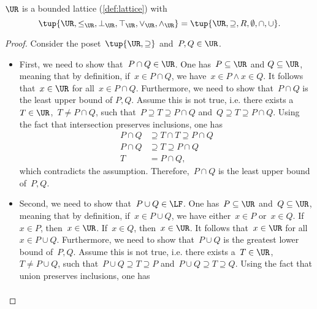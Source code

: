 
\begin{lemma}
  \label{lem:u_bounded_lat}
  $\UR$ is a bounded lattice (\cref{def:lattice}) with
  \begin{equation}
    \tup{\UR,\leq_{\UR},\bot_{\UR},\top_{\UR},\vee_{\UR},\wedge_{\UR}}=\tup{\UR,\supseteq,R,\emptyset,\cap,\cup}.
  \end{equation}
\end{lemma}
\begin{proof}
  Consider the poset~$\tup{\UR,\supseteq}$ and~$P,Q\in \UR$.
  \begin{itemize}
    \item First, we need to show that~$P\cap Q\in \UR$. One has~$P \subseteq \UR$ and $Q\subseteq \UR$, meaning that by definition, if~$x\in P\cap Q$, we have~$x\in P \wedge x\in Q$. It follows that~$x\in \UR$ for all~$x\in P\cap Q$. Furthermore, we need to show that~$P\cap Q$ is the least upper bound of $P,Q$. Assume this is not true, i.e. there exists a~$T\in \UR$,~$T\neq P\cap Q$, such that~$P\supseteq T\supseteq P\cap Q$ and~$Q\supseteq T\supseteq P\cap Q$. Using the fact that intersection preserves inclusions, one has
    \begin{equation}
      \begin{aligned}
        P\cap Q &\supseteq T\cap T \supseteq P\cap Q\\
        P\cap Q &\supseteq T \supseteq P\cap Q\\
        T&= P\cap Q,
      \end{aligned}
    \end{equation}
    which contradicts the assumption. Therefore,~$P\cap Q$ is the least upper bound of~$P,Q$.
    \item Second, we need to show that~$P\cup Q\in \LF$. One has~$P\subseteq \UR$ and~$Q\subseteq \UR$, meaning that by definition, if~$x\in P\cup Q$, we have either~$x\in P$ or~$x\in Q$. If~$x\in P$, then~$x\in \UR$. If~$x\in Q$, then~$x\in \UR$. It follows that~$x\in \UR$ for all~$x\in P\cup Q$. Furthermore, we need to show that~$P\cup Q$ is the greatest lower bound of~$P,Q$. Assume this is not true, i.e. there exists a~$T\in \UR$,~$T\neq P\cup Q$, such that~$P\cup Q\supseteq T\supseteq P$ and~$P\cup Q\supseteq T\supseteq Q$. Using the fact that union preserves inclusions, one has
    \begin{equation}
      \begin{aligned}

\end{aligned}
\end{equation}
\end{itemize}
\end{proof}
